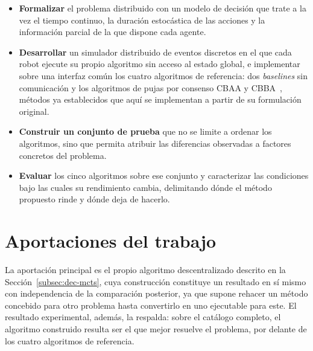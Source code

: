 \begin{itemize}
    \item \textbf{Formalizar} el problema distribuido con un modelo de decisión que trate a la vez el tiempo continuo, la duración estocástica de las acciones y la información parcial de la que dispone cada agente.

    \item \textbf{Desarrollar} un simulador distribuido de eventos discretos en el que cada robot ejecute su propio algoritmo sin acceso al estado global, e implementar sobre una interfaz común los cuatro algoritmos de referencia: dos \textit{baselines} sin comunicación y los algoritmos de pujas por consenso CBAA y CBBA~\cite{choi2009consensus}, métodos ya establecidos que aquí se implementan a partir de su formulación original.

    \item \textbf{Construir un conjunto de prueba} que no se limite a ordenar los algoritmos, sino que permita atribuir las diferencias observadas a factores concretos del problema.

    \item \textbf{Evaluar} los cinco algoritmos sobre ese conjunto y caracterizar las condiciones bajo las cuales su rendimiento cambia, delimitando dónde el método propuesto rinde y dónde deja de hacerlo.
\end{itemize}

\section{Aportaciones del trabajo} \label{sec:intro-aportaciones}

La aportación principal es el propio algoritmo descentralizado descrito en la Sección~\ref{subsec:dec-mcts}, cuya construcción constituye un resultado en sí mismo con independencia de la comparación posterior, ya que supone rehacer un método concebido para otro problema hasta convertirlo en uno ejecutable para este. El resultado experimental, además, la respalda: sobre el catálogo completo, el algoritmo construido resulta ser el que mejor resuelve el problema, por delante de los cuatro algoritmos de referencia.

